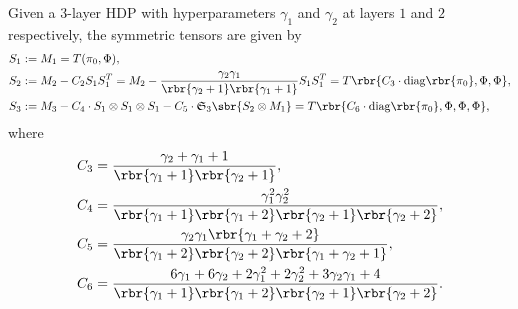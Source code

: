 \documentclass[twoside,11pt]{article}
\newcommand{\symm}{\mathfrak{S}}
\begin{document}
{%
\begin{lemma}
 \label{lem:hdp3moments}
 Given a $3$-layer HDP with hyperparameters $\gamma_1$ and $\gamma_2$
 at layers $1$ and $2$ respectively, the symmetric tensors are given by
 \begin{align}
   S_1 &:= M_1 = T(\pi_0, \Phi), \nonumber\\
	S_2  &:= M_2 - C_2 S_1 S_1^T = M_2 - \frac{\gamma_2 \gamma_1}{\rbr{\gamma_2+1}\rbr{\gamma_1+1}} S_1 S_1^T =  T\rbr{  C_3 \cdot \mathrm{diag}\rbr{ \pi_0} , \Phi, \Phi},\nonumber \\
	S_3  &:=  M_3 - C_4  \cdot S_1 \otimes S_1 \otimes S_1 -C_5  \cdot \symm_3\sbr{ S_2 \otimes M_1}  = T\rbr{    C_6 \cdot \mathrm{diag}\rbr{\pi_0} ,\Phi,\Phi,\Phi} \nonumber,\label{eq:S}
\end{align}
where 
\begin{align*}
C_3&=\frac{\gamma_2 + \gamma_1 + 1}{ \rbr{\gamma_1+1} \rbr{\gamma_2+1}},\\
C_4 &= \frac{\gamma_1^2\gamma_2^2}{\rbr{\gamma_1+1}\rbr{\gamma_1+2}\rbr{\gamma_2+1}\rbr{\gamma_2+2}},\\
C_5 &=  \frac{\gamma_2\gamma_1\rbr{\gamma_1+\gamma_2+2}}{\rbr{\gamma_1+2}\rbr{\gamma_2+2}\rbr{\gamma_1+\gamma_2+1}},\\
C_6 &= \frac{ 6\gamma_1 +6 \gamma_2 +2\gamma_1^2+ 2\gamma_2^2 +3 \gamma_2 \gamma_1 + 4 }{ \rbr{\gamma_1+1}\rbr{\gamma_1+2}\rbr{\gamma_2+1}\rbr{\gamma_2+2}}.
\end{align*}
\end{lemma}

}
\end{document}
